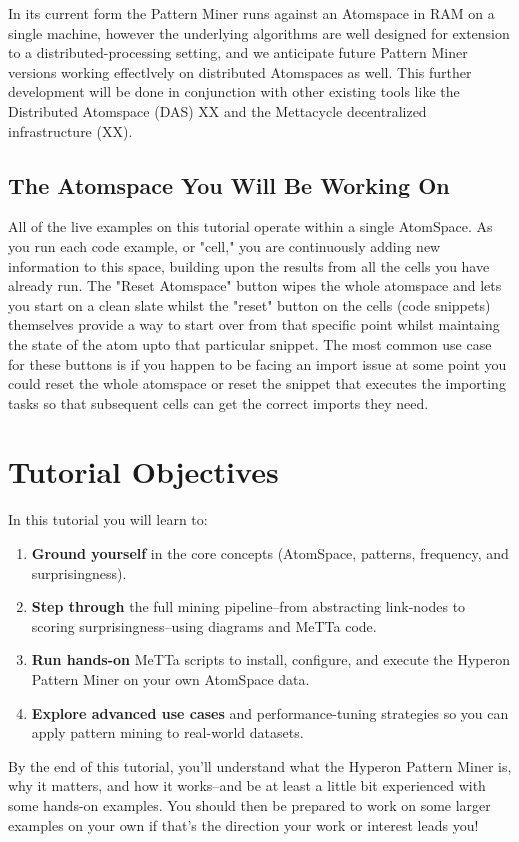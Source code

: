 \documentclass{article}
\begin{document}
In its current form the Pattern Miner runs against an Atomspace in RAM on a single machine, however the underlying algorithms are well designed for extension to a distributed-processing setting, and we anticipate future Pattern Miner versions working effectlvely on distributed Atomspaces as well.   This further development will be done in conjunction with other existing tools like the Distributed Atomspace (DAS) XX and the Mettacycle decentralized infrastructure (XX).

\subsection{The Atomspace You Will Be Working On}

All of the live examples on this tutorial operate within a single AtomSpace. As you run each code example, or "cell," you are continuously adding new information to this space, building upon the results from all the cells you have already run. The "Reset Atomspace" button wipes the whole atomspace and lets you start on a clean slate whilst the "reset" button on the cells (code snippets) themselves  provide a way to start over from that specific point whilst maintaing the state of the atom upto that particular snippet. The most common use case for these buttons is if you happen to be facing an import issue at some point you could reset the whole atomspace or reset the snippet that executes the importing tasks so that subsequent cells can get the correct imports they need. 

\section{Tutorial Objectives}

In this tutorial you will learn to:

\begin{enumerate}
  \item \textbf{Ground yourself} in the core concepts (AtomSpace, patterns, frequency, and surprisingness).
  \item \textbf{Step through} the full mining pipeline--from abstracting link-nodes to scoring surprisingness--using diagrams and MeTTa code.
  \item \textbf{Run hands-on} MeTTa scripts to install, configure, and execute the Hyperon Pattern Miner on your own AtomSpace data.
  \item \textbf{Explore advanced use cases} and performance-tuning strategies so you can apply pattern mining to real-world datasets.
\end{enumerate}

By the end of this tutorial, you'll understand what the Hyperon Pattern Miner is, why it matters, and how it works--and be at least a little bit experienced with some hands-on examples.   You should then be prepared to work on some larger examples on your own if that's the direction your work or interest leads you!
\end{document}
